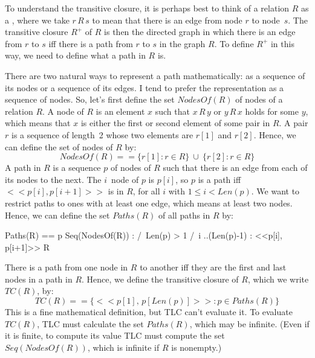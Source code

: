 \documentclass[fleqn,leqno]{article}
\begin{document}
To understand the transitive closure, it is perhaps best to think of a
relation $R$ as a 
  , 
where we take $r\,R\,s$ to mean that there is an edge from node $r$ to
node~$s$.  The transitive closure $R^{+}$ of $R$ is then the directed
graph in which there is an edge from $r$ to $s$ iff there is a path
from $r$ to $s$ in the graph $R$.  To define $R^{+}$ in this way, we
need to define what a path in $R$ is.

There are two natural ways to represent a path mathematically: as a
sequence of its nodes or a sequence of its edges.  I tend to prefer
the representation as a sequence of nodes.  So, let's first define the
set $NodesOf(R)$ of nodes of a relation $R$.  A node of $R$ is an
element $x$ such that $x\,R\,y$ or $y\,R\,x$ holds for some $y$, which
means that $x$ is either the first or second element of some pair in
$R$.  A pair $r$ is a sequence of length~2 whose two elements are
$r[1]$ and $r[2]$.  Hence, we can define the set of nodes of $R$ by:
 \[ NodesOf(R) == \{r[1] : r \in R\} \ \cup \ \{r[2] : r \in R\}
 \]
A path in $R$ is a sequence $p$ of nodes of $R$ such that there is an
edge from each of its nodes to the next.  The $i$\tth\ node of $p$ is
$p[i]$, so $p$ is a path iff $<<p[i], p[i+1]>>$ is in $R$, for all $i$ with
$1\leq i < Len(p)$.  We want to restrict paths to ones with at least
one edge, which means at least two nodes.  Hence, we can define
the set $Paths(R)$ of all paths in $R$ by:
\begin{display}
\begin{notla}
Paths(R) == { p \in Seq(NodesOf(R)) : 
                /\ Len(p) > 1 
                /\ \A i ..(Len(p)-1) : <<p[i], p[i+1]>> \in R }
\end{notla}
\begin{tlatex}
%
%
\end{tlatex}
\end{display}
There is a path from one node in $R$ to another iff they are the first
and last nodes in a path in $R$.  Hence, we define the transitive
closure of $R$, which we write $TC(R)$, by:
  \[ TC(R) == \{ <<p[1],\, p[Len(p)]>> : p \in Paths(R) \}\]
This is a fine mathematical definition, but TLC can't evaluate it.  To
evaluate $TC(R)$, TLC must calculate the set $Paths(R)$, which may be
infinite.  (Even if it is finite, to compute its value TLC must
compute the set $Seq(NodesOf(R))$, which is infinite if $R$ is
nonempty.)
\end{document}
